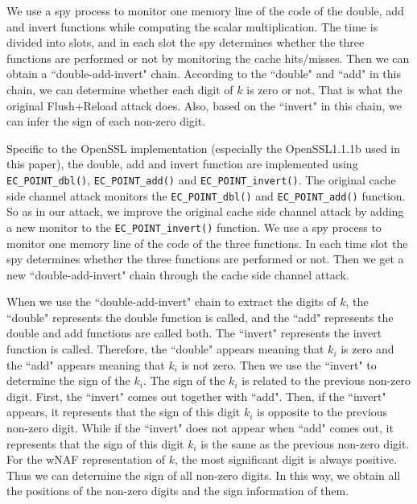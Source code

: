 We use a spy process to monitor one memory line of the code of the double, add and invert functions while computing the scalar multiplication.
The time is divided into slots, and in each slot
  the spy determines whether the three functions are performed or not by monitoring the cache hits/misses.
 Then we can obtain a ``double-add-invert" chain.
According to the ``double" and ``add" in this chain, we can determine whether each digit of $k$ is zero or not.
  That is what the original Flush+Reload attack does.
Also, based on the ``invert" in this chain, we can infer the sign of each non-zero digit.


Specific to the OpenSSL implementation (especially the OpenSSL1.1.1b used in this paper),
  the double, add and invert function are implemented using  \verb+EC_POINT_dbl()+, \verb+EC_POINT_add()+ and \verb+EC_POINT_invert()+.
 The original cache side channel attack monitors the \verb+EC_POINT_dbl()+ and \verb+EC_POINT_add()+ function.
So as in our attack, we improve the original cache side channel attack by adding a new monitor to the \verb+EC_POINT_invert()+ function.
We use a spy process to monitor one memory line of the code of the three functions.
 In each time slot
  the spy determines whether the three functions are performed or not.
Then we get a new ``double-add-invert" chain through the cache side channel attack.



When we use the ``double-add-invert" chain to extract the digits of $k$,
the ``double" represents the double function is called,
and the ``add" represents the double and add functions are called both.
The ``invert" represents the invert function is called.
Therefore,
 the ``double" appears meaning that $k_i$ is zero
and the ``add" appears meaning that $k_i$ is not zero.
 Then we use the ``invert" to determine the sign of the $k_i$.
The sign of the $k_i$ is related to the previous non-zero digit.
First, the ``invert" comes out together with ``add".
 Then, if the ``invert" appears, it represents that the sign of this digit $k_i$ is opposite to the previous non-zero digit.
 While if the ``invert" does not appear when ``add" comes out, it represents that
the sign of this digit $k_i$ is the same as the previous non-zero digit.
 For the wNAF representation of $k$, the most significant digit is always positive.
 Thus we can determine the sign of all non-zero digits.
In this way, we obtain all the positions of the non-zero digits and the sign information of them.


